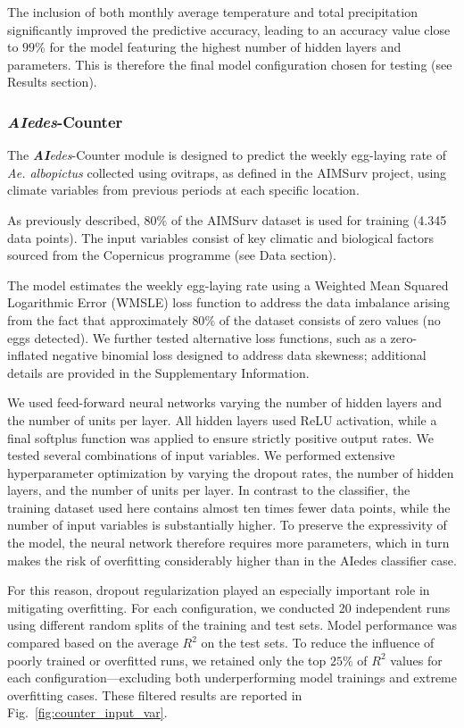 \documentclass[preprint,12pt]{elsarticle}
\begin{document}
The inclusion of both monthly average temperature and total precipitation significantly improved the predictive accuracy, leading to an accuracy value close to $99\%$  for the model featuring the highest number of hidden layers and parameters. This is therefore the final model configuration chosen for testing (see Results section).

\subsubsection{\textit{\textbf{AI}edes}-Counter}
The \textit{\textbf{AI}edes}-Counter module is designed to predict the weekly egg-laying rate of \emph{Ae. albopictus} collected using ovitraps, as defined in the AIMSurv project, using climate variables from previous periods at each specific location.

As previously described, $80\%$ of the AIMSurv dataset is used for training (4.345 data points). 
The input variables consist of key climatic and biological factors sourced from the Copernicus programme (see Data section).

The model estimates the weekly egg-laying rate using a Weighted Mean Squared Logarithmic Error (WMSLE) loss function to address the data imbalance arising from the fact that approximately $80\%$ of the dataset consists of zero values (no eggs detected). We further tested alternative loss functions, such as a zero-inflated negative binomial loss designed to address data skewness; additional details are provided in the Supplementary Information.

We used feed-forward neural networks varying the number of hidden layers and the number of units per layer. All hidden layers used ReLU activation, while a final softplus function was applied to ensure strictly positive output rates. We tested several combinations of input variables.
We performed extensive hyperparameter optimization by varying the dropout rates, the number of hidden layers, and the number of units per layer. 
In contrast to the classifier, the training dataset used here contains almost ten times fewer data points, while the number of input variables is substantially higher. To preserve the expressivity of the model, the neural network therefore requires more parameters, which in turn makes the risk of overfitting considerably higher than in the AIedes classifier case.

For this reason, dropout regularization \cite{srivastava2014dropout} played an especially important role in mitigating overfitting. For each configuration, we conducted 20 independent runs using different random splits of the training and test sets. Model performance was compared based on the average $R^2$ on the test sets. To reduce the influence of poorly trained or overfitted runs, we retained only the top $25\%$ of $R^2$ values for each configuration—excluding both underperforming model trainings and extreme overfitting cases. These filtered results are reported in Fig.~\ref{fig:counter_input_var}.
\end{document}
